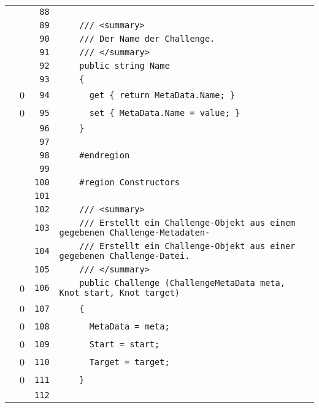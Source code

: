 \documentclass[a4paper,10pt]{article}
\begin{document}
\begin{longtable}[l]{lrrl}
\cellcolor{gray} &  & \verb~88~ & \verb~~\\
\cellcolor{gray} &  & \verb~89~ & \verb~    /// <summary>~\\
\cellcolor{gray} &  & \verb~90~ & \verb~    /// Der Name der Challenge.~\\
\cellcolor{gray} &  & \verb~91~ & \verb~    /// </summary>~\\
\cellcolor{gray} &  & \verb~92~ & \verb~    public string Name~\\
\cellcolor{gray} &  & \verb~93~ & \verb~    {~\\
\cellcolor{red} & 0 & \verb~94~ & \verb~      get { return MetaData.Name; }~\\
\cellcolor{red} & 0 & \verb~95~ & \verb~      set { MetaData.Name = value; }~\\
\cellcolor{gray} &  & \verb~96~ & \verb~    }~\\
\cellcolor{gray} &  & \verb~97~ & \verb~~\\
\cellcolor{gray} &  & \verb~98~ & \verb~    #endregion~\\
\cellcolor{gray} &  & \verb~99~ & \verb~~\\
\cellcolor{gray} &  & \verb~100~ & \verb~    #region Constructors~\\
\cellcolor{gray} &  & \verb~101~ & \verb~~\\
\cellcolor{gray} &  & \verb~102~ & \verb~    /// <summary>~\\
\cellcolor{gray} &  & \verb~103~ & \verb~    /// Erstellt ein Challenge-Objekt aus einem gegebenen Challenge-Metadaten-~\\
\cellcolor{gray} &  & \verb~104~ & \verb~    /// Erstellt ein Challenge-Objekt aus einer gegebenen Challenge-Datei.~\\
\cellcolor{gray} &  & \verb~105~ & \verb~    /// </summary>~\\
\cellcolor{red} & 0 & \verb~106~ & \verb~    public Challenge (ChallengeMetaData meta, Knot start, Knot target)~\\
\cellcolor{red} & 0 & \verb~107~ & \verb~    {~\\
\cellcolor{red} & 0 & \verb~108~ & \verb~      MetaData = meta;~\\
\cellcolor{red} & 0 & \verb~109~ & \verb~      Start = start;~\\
\cellcolor{red} & 0 & \verb~110~ & \verb~      Target = target;~\\
\cellcolor{red} & 0 & \verb~111~ & \verb~    }~\\
\cellcolor{gray} &  & \verb~112~ & \verb~~\\

\end{longtable}
\end{document}
